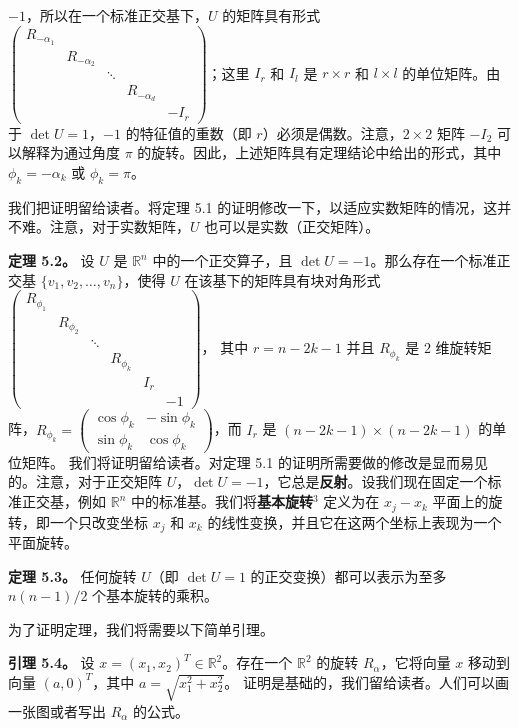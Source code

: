 $-1$，所以在一个标准正交基下，$U$ 的矩阵具有形式 $\begin{pmatrix} R_{-\alpha_1} & & & & \\ & R_{-\alpha_2} & & & \\ & & \ddots & & \\ & & & R_{-\alpha_d} & \\ & & & & -I_r \end{pmatrix}$；这里 $I_r$ 和 $I_l$ 是 $r \times r$ 和 $l \times l$ 的单位矩阵。由于 $\det U = 1$，$-1$ 的特征值的重数（即 $r$）必须是偶数。注意，$2 \times 2$ 矩阵 $-I_2$ 可以解释为通过角度 $\pi$ 的旋转。因此，上述矩阵具有定理结论中给出的形式，其中 $\phi_k = -\alpha_k$ 或 $\phi_k = \pi$。

我们把证明留给读者。将定理 5.1 的证明修改一下，以适应实数矩阵的情况，这并不难。注意，对于实数矩阵，$U$ 也可以是实数（正交矩阵）。




\textbf{定理 5.2。} 设 $U$ 是 $\mathbb{R}^n$ 中的一个正交算子，且 $\det U = -1$。那么存在一个标准正交基 $\{v_1, v_2, \dots, v_n\}$，使得 $U$ 在该基下的矩阵具有块对角形式
$\begin{pmatrix} R_{\phi_1} & & & & & \\ & R_{\phi_2} & & & & \\ & & \ddots & & & \\ & & & R_{\phi_k} & & \\ & & & & I_r & \\ & & & & & -1 \end{pmatrix}$，
其中 $r = n - 2k - 1$ 并且 $R_{\phi_k}$ 是 $2$ 维旋转矩阵，$R_{\phi_k} = \begin{pmatrix} \cos \phi_k & -\sin \phi_k \\ \sin \phi_k & \cos \phi_k \end{pmatrix}$，而 $I_r$ 是 $(n-2k-1) \times (n-2k-1)$ 的单位矩阵。
我们将证明留给读者。对定理 5.1 的证明所需要做的修改是显而易见的。注意，对于正交矩阵 $U$，$\det U = -1$，它总是\textbf{反射}。设我们现在固定一个标准正交基，例如 $\mathbb{R}^n$ 中的标准基。我们将\textbf{基本旋转}$^3$ 定义为在 $x_j - x_k$ 平面上的旋转，即一个只改变坐标 $x_j$ 和 $x_k$ 的线性变换，并且它在这两个坐标上表现为一个平面旋转。

\textbf{定理 5.3。} 任何旋转 $U$（即 $\det U = 1$ 的正交变换）都可以表示为至多 $n(n-1)/2$ 个基本旋转的乘积。

为了证明定理，我们将需要以下简单引理。

\textbf{引理 5.4。} 设 $x = (x_1, x_2)^T \in \mathbb{R}^2$。存在一个 $\mathbb{R}^2$ 的旋转 $R_\alpha$，它将向量 $x$ 移动到向量 $(a, 0)^T$，其中 $a = \sqrt{x_1^2 + x_2^2}$。
证明是基础的，我们留给读者。人们可以画一张图或者写出 $R_\alpha$ 的公式。

